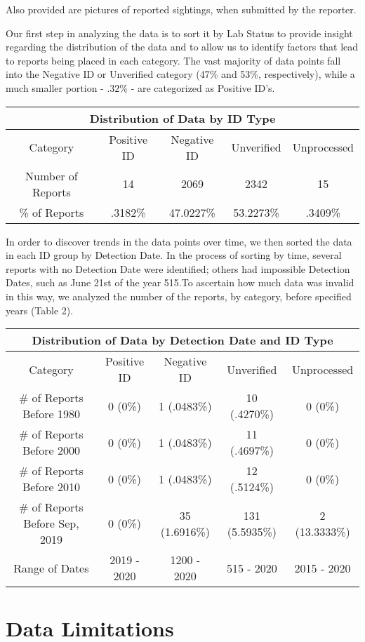 \documentclass[letterpaper]{article}
\begin{document}
\begin{flushleft}
Also provided are pictures of reported sightings, when submitted by the reporter.

Our first step in analyzing the data is to sort it by Lab Status to provide insight regarding the distribution of the data and to allow us to identify factors that lead to reports being placed in each category. The vast majority of data points fall into the Negative ID or Unverified category (47\% and 53\%, respectively), while a much smaller portion - $.32\%$ - are categorized as Positive ID's.

\end{flushleft}

\begin{center}
 \label{tab:title} 
 \begin{tabular}{||c c c c c||} 
 \hline
 \multicolumn{5}{|c|}{Distribution of Data by ID Type} \\
 \hline
 Category & Positive ID & Negative ID & Unverified & Unprocessed  \\ [0.5ex] 
 \hline
 Number of Reports & 14 & 2069 & 2342 & 15 \\ 
 \hline
\% of Reports & .3182\% & 47.0227\% & 53.2273\% & .3409\% \\

 \hline
\end{tabular}

\end{center}

\begin{flushleft}
In order to discover trends in the data points over time, we then sorted the data in each ID group by Detection Date. In the process of sorting by time, several reports with no Detection Date were identified; others had impossible Detection Dates, such as June 21st of the year 515.To ascertain how much data was invalid in this way, we analyzed the number of the reports, by category, before specified years (Table 2). 
\end{flushleft}

\begin{center}
 \label{tab:title} 
 \begin{tabular}{||c c c c c||} 
 \hline
 \multicolumn{5}{|c|}{Distribution of Data by Detection Date and ID Type} \\
 \hline
 Category & Positive ID & Negative ID & Unverified & Unprocessed  \\ [0.5ex] 
 \hline
 \# of Reports Before 1980 & 0 (0\%) & 1 (.0483\%) & 10 (.4270\%) & 0 (0\%) \\ 
 \hline
\# of Reports Before 2000 & 0 (0\%) & 1 (.0483\%) & 11 (.4697\%) & 0 (0\%) \\
\hline
\# of Reports Before 2010 & 0 (0\%) & 1 (.0483\%) & 12 (.5124\%) & 0 (0\%) \\
\hline
\# of Reports Before Sep, 2019 & 0 (0\%) & 35 (1.6916\%) & 131 (5.5935\%) & 2 (13.3333\%) \\
\hline
Range of Dates & 2019 - 2020 & 1200 - 2020 & 515 - 2020 & 2015 - 2020 \\
\hline
\end{tabular}
\end{center}



\section{Data Limitations}
\end{document}

